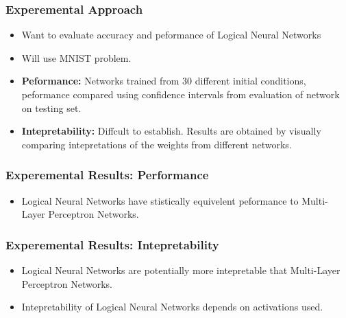 \documentclass{beamer}
\begin{document}
\begin{frame}
\frametitle{Experemental Approach}

\begin{itemize}
\item Want to evaluate accuracy and peformance of Logical Neural Networks
\item Will use MNIST problem.
\item \textbf{Peformance:} Networks trained from 30 different initial conditions, peformance compared using confidence intervals from evaluation of network on testing set.
\item \textbf{Intepretability:} Diffcult to establish. Results are obtained by visually comparing intepretations of the weights from different networks.
\end{itemize}
\end{frame}

\begin{frame}
\frametitle{Experemental Results: Performance}

\begin{itemize}
\item Logical Neural Networks have stistically equivelent peformance to Multi-Layer Perceptron Networks.
\end{itemize}
\end{frame}

\begin{frame}
\frametitle{Experemental Results: Intepretability}
\begin{itemize}
\item Logical Neural Networks are potentially more intepretable that Multi-Layer Perceptron Networks.
\item Intepretability of Logical Neural Networks depends on activations used.
\end{itemize}
\end{frame}
\end{document}
